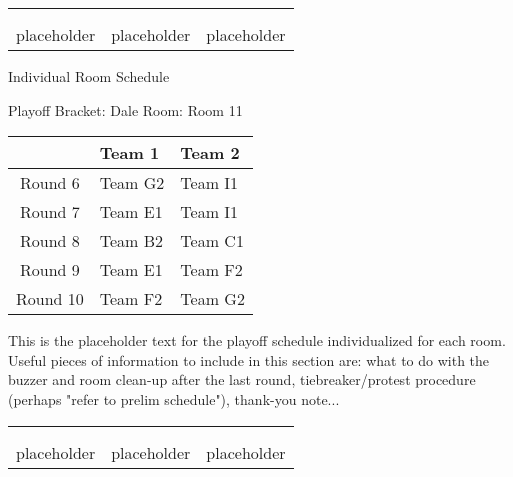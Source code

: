 \documentclass{article}%
\begin{document}
%
\begin{tabularx}{\textwidth}{YYY}%
  &  &  \\%
\\%
placeholder&placeholder&placeholder\\%
\end{tabularx}%
\newpage%
\begin{center}%
\begin{Huge}%
Individual Room Schedule%
\end{Huge}%
\vspace*{16pt}%
\linebreak%
\begin{Large}%
Playoff Bracket: Dale \hfill Room: Room 11%
\end{Large}%
\end{center}%
%
\begin{tabularx}{\textwidth}{|c|Y|Y|}%
\hline%
&Team 1&Team 2\\%
\hline%
Round 6&Team G2&Team I1\\%
Round 7&Team E1&Team I1\\%
Round 8&Team B2&Team C1\\%
Round 9&Team E1&Team F2\\%
Round 10&Team F2&Team G2\\%
\hline%
\end{tabularx}%
\vspace*{16pt}%
\linebreak%
This is the placeholder text for the playoff schedule individualized for each room. Useful pieces of information to include in this section are: what to do with the buzzer and room clean{-}up after the last round, tiebreaker/protest procedure (perhaps "refer to prelim schedule"), thank{-}you note...%
\vspace*{30pt}%
\newline%
%
\begin{tabularx}{\textwidth}{YYY}%
  &  &  \\%
\\%
placeholder&placeholder&placeholder\\%
\end{tabularx}%
\end{document}
